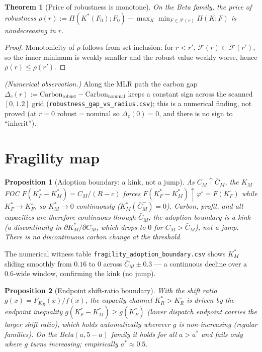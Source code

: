 \documentclass[11pt]{article}
\newtheorem{proposition}{Proposition}
\newtheorem{theorem}{Theorem}
\begin{document}
\begin{theorem}[Price of robustness is monotone]\label{thm:robust}
On the Beta family, the price of robustness $\rho(r) :=
\Pi(K^\ast(F_0); F_0) - \max_K \min_{F \in \mathcal F(r)} \Pi(K;F)$
is nondecreasing in $r$.
\end{theorem}

\begin{proof}
Monotonicity of $\rho$ follows from set inclusion: for $r<r'$,
$\mathcal F(r)\subset\mathcal F(r')$, so the inner minimum is weakly smaller and the
robust value weakly worse, hence $\rho(r)\le\rho(r')$.
\end{proof}

\noindent\emph{(Numerical observation.)} Along the MLR path the carbon gap
$\Delta_c(r) := \mathrm{Carbon}_{\text{robust}} - \mathrm{Carbon}_{\text{nominal}}$ keeps a
constant sign across the scanned $[0,1.2]$ grid
(\texttt{robustness\_gap\_vs\_radius.csv}); this is a numerical finding, not proved
(at $r=0$ robust${}={}$nominal so $\Delta_c(0)=0$, and there is no sign to ``inherit'').

\section{Fragility map}
\begin{proposition}[Adoption boundary: a kink, not a jump]\label{prop:adoption}
As $C_M \uparrow \bar C_M$, the $K_M$ FOC $F(K_F^\ast-K_M^\ast)=C_M/(R-c)$ forces
$F(K_F^\ast-K_M^\ast)\uparrow\varphi^{\circ}=F(K_F^{\circ})$ while $K_F^\ast\to K_F^{\circ}$,
so $K_M^\ast\to 0$ \emph{continuously} ($K_M^\ast(\bar C_M^-)=0$). Carbon, profit, and all
capacities are therefore \emph{continuous} through $\bar C_M$; the adoption boundary is a
\emph{kink} (a discontinuity in $\partial K_M^\ast/\partial C_M$, which drops to $0$ for
$C_M>\bar C_M$), not a jump. There is no discontinuous carbon change at the threshold.
\end{proposition}

The numerical witness table \texttt{fragility\_adoption\_boundary.csv}
shows $K_M^\ast$ sliding smoothly from $0.16$ to $0$ across $\bar C_M \pm 0.3$ ---
a continuous decline over a $0.6$-wide window, confirming the kink (no jump).

\begin{proposition}[Endpoint shift-ratio boundary]\label{prop:endpoint}
With the shift ratio $g(x)=F_{K_R}(x)/f(x)$, the capacity channel $K_R^\ast>K_R^{\circ}$
is driven by the endpoint inequality
$g(K_F^\ast - K_M^\ast) \ge g(K_F^\ast)$ (lower dispatch endpoint carries the larger shift
ratio), which holds automatically wherever $g$ is non-increasing (regular families). On the
Beta$(a,5-a)$ family it holds for all $a>a^\ast$ and fails only where $g$ turns increasing;
empirically $a^\ast \approx 0.5$.
\end{proposition}
\end{document}

